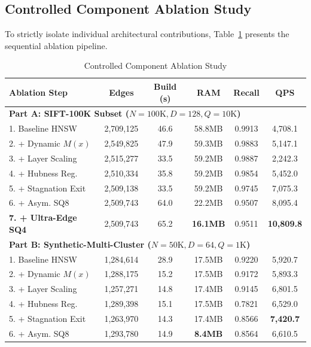 \documentclass[conference,10pt]{IEEEtran}
\begin{document}
\subsection{Controlled Component Ablation Study}
To strictly isolate individual architectural contributions, Table~\ref{tab:ablation} presents the sequential ablation pipeline.

\begin{table}[htbp]
\caption{Controlled Component Ablation Study}
\label{tab:ablation}
\centering
\begin{tabular}{lccccc}
\toprule
\textbf{Ablation Step} & \textbf{Edges} & \textbf{Build (s)} & \textbf{RAM} & \textbf{Recall} & \textbf{QPS} \\
\midrule
\multicolumn{6}{l}{\textbf{Part A: SIFT-100K Subset ($N=100\text{K}, D=128, Q=10\text{K}$)}} \\
1. Baseline HNSW & 2,709,125 & 46.6 & 58.8MB & 0.9913 & 4,708.1 \\
2. + Dynamic $M(x)$ & 2,549,825 & 47.9 & 59.3MB & 0.9883 & 5,147.1 \\
3. + Layer Scaling & 2,515,277 & 33.5 & 59.2MB & 0.9887 & 2,242.3 \\
4. + Hubness Reg. & 2,510,334 & 35.8 & 59.2MB & 0.9854 & 5,452.0 \\
5. + Stagnation Exit & 2,509,138 & 33.5 & 59.2MB & 0.9745 & 7,075.3 \\
6. + Asym. SQ8 & 2,509,743 & 64.0 & 22.2MB & 0.9507 & 8,095.4 \\
\textbf{7. + Ultra-Edge SQ4} & 2,509,743 & 65.2 & \textbf{16.1MB} & 0.9511 & \textbf{10,809.8} \\
\midrule
\multicolumn{6}{l}{\textbf{Part B: Synthetic-Multi-Cluster ($N=50\text{K}, D=64, Q=1\text{K}$)}} \\
1. Baseline HNSW & 1,284,614 & 28.9 & 17.5MB & 0.9220 & 5,920.7 \\
2. + Dynamic $M(x)$ & 1,288,175 & 15.2 & 17.5MB & 0.9172 & 5,893.3 \\
3. + Layer Scaling & 1,257,271 & 14.8 & 17.4MB & 0.9145 & 6,801.5 \\
4. + Hubness Reg. & 1,289,398 & 15.1 & 17.5MB & 0.7821 & 6,529.0 \\
5. + Stagnation Exit & 1,263,970 & 14.3 & 17.4MB & 0.8566 & \textbf{7,420.7} \\
6. + Asym. SQ8 & 1,293,780 & 14.9 & \textbf{8.4MB} & 0.8564 & 6,610.5 \\
\bottomrule
\end{tabular}
\end{table}
\end{document}

